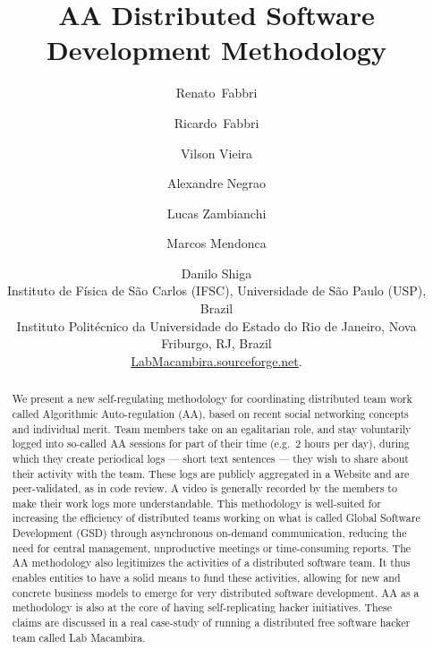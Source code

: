 \title{
AA Distributed Software Development Methodology
}

\author{%
Renato~Fabbri \and Ricardo~Fabbri \and Vilson Vieira \and Alexandre Negrao \and Lucas Zambianchi
\and Marcos Mendonca \and Danilo Shiga\\[1em]
\small{
Instituto de F\'{i}sica de S\~{a}o Carlos (IFSC), Universidade de
S\~{a}o Paulo (USP), Brazil}\\[1em]
\small{Instituto Polit\'{e}cnico da Universidade do Estado do Rio de
Janeiro, Nova Friburgo, RJ, Brazil}\\[1em]
\url{LabMacambira.sourceforge.net}.
}


\maketitle

\begin{abstract}
We present a new self-regulating methodology for coordinating
distributed team work called Algorithmic Auto-regulation (AA), based
on recent social networking concepts and individual merit. Team
members take on an egalitarian role, and stay voluntarily logged into
so-called AA sessions for part of their time (e.g.\ 2 hours per day),
during which they create periodical logs --- short text sentences ---
they wish to share about their activity with the team. These logs are
publicly aggregated in a Website and are peer-validated, as in code
review. A video is generally recorded by the members to make their
work logs more understandable. This methodology is well-suited for
increasing the efficiency of distributed teams working on what is
called Global Software Development (GSD) through asynchronous
on-demand communication, reducing the need for central management,
unproductive meetings or time-consuming reports. The AA methodology
also legitimizes the activities of a distributed software team.  It
thus enables entities to have a solid means to fund these activities,
allowing for new and concrete business models to emerge for very
distributed software development. AA as a methodology is also at the
core of having self-replicating hacker initiatives. These claims are
discussed in a real case-study of running a distributed free software
hacker team called Lab Macambira.
\end{abstract}

